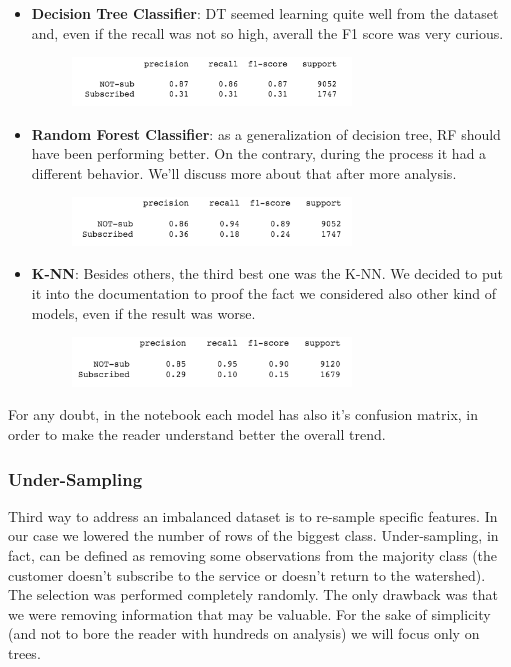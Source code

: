\begin{itemize}
\item \textbf{Decision Tree Classifier}: DT seemed learning quite well from the dataset and, even if the recall was not so high, averall the F1 score was very curious.

\begin{figure}[H]
\centering
\includegraphics[width=0.7\textwidth]{Img/normal_tree.png}
\end{figure}
\item \textbf{Random Forest Classifier}: as a generalization of decision tree, RF should have been performing better. On the contrary, during the process it had a different behavior. We'll discuss more about that after more analysis.

\begin{figure}[H]
\centering
\includegraphics[width=0.7\textwidth]{Img/normal_forest.png}
\end{figure}

\item \textbf{K-NN}: Besides others, the third best one was the K-NN. We decided to put it into the documentation to proof the fact we considered also other kind of models, even if the result was worse.

\begin{figure}[H]
\centering
\includegraphics[width=0.7\textwidth]{Img/normal_knn.png}
\end{figure}
\end{itemize}

For any doubt, in the notebook each model has also it's confusion matrix, in order to make the reader understand better the overall trend.

\newpage
\subsubsection{Under-Sampling}
Third way to address an imbalanced dataset is to re-sample specific features. In our case we lowered the number of rows of the biggest class. Under-sampling, in fact, can be defined as removing some observations from the majority class (the customer doesn't subscribe to the service or doesn't return to the watershed). 
The selection was performed completely randomly. The only drawback was that we were removing information that may be valuable. For the sake of simplicity (and not to bore the reader with hundreds on analysis) we will focus only on trees.

